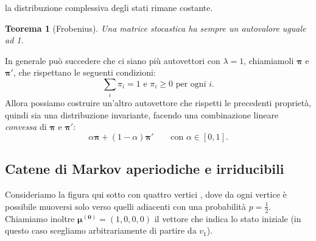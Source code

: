 \documentclass{article}
\newtheorem{theorem}{Teorema}[section]
\theoremstyle{definition}
\theoremstyle{definition}
\theoremstyle{remark}
\begin{document}
la distribuzione complessiva degli stati rimane costante.
\begin{theorem}[Frobenius]
    Una matrice \textit{stocastica} ha sempre un autovalore uguale ad 1.
\end{theorem}
In  generale può succedere che ci siano più autovettori con $\lambda = 1$, chiamiamoli $\boldsymbol{\pi}$ e $\boldsymbol{\pi}'$, che rispettano le seguenti condizioni:
$$ \sum_i \pi_i = 1 \text{ e }\pi_i\ge 0 \text{ per ogni $i$.}$$
Allora possiamo costruire un'altro autovettore che rispetti le precedenti proprietà, quindi sia una distribuzione invariante, facendo una combinazione lineare \textit{convessa} di $\boldsymbol{\pi}$ e $\boldsymbol{\pi}'$:
$$\alpha\boldsymbol{\pi} + (1-\alpha)\boldsymbol{\pi'}\qquad \text{con $\alpha \in [0,1]$.}$$
\subsection{Catene di Markov aperiodiche e irriducibili}
Consideriamo la figura qui sotto con quattro vertici , dove da ogni vertice è
possibile muoversi solo verso quelli adiacenti con una probabilità  $p=\frac{1}{2}$. Chiamiamo inoltre $\boldsymbol{\mu^{(0)}} = (1,0,0,0)$ il vettore che indica
lo stato iniziale (in questo caso scegliamo arbitrariamente di partire da $v_1$).
\begin{center}







\end{center}
\end{document}
